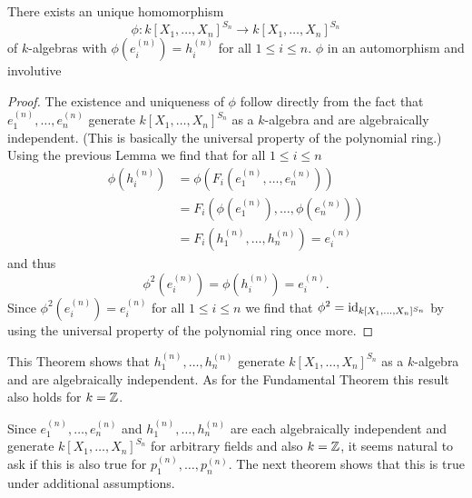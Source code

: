 \begin{thrm}
There exists an unique homomorphism
\[
 \phi : k[X_1, \ldots, X_n]^{S_n} \to k[X_1, \ldots, X_n]^{S_n}
\]
of $k$-algebras with $\phi\left(e^{(n)}_i\right) = h^{(n)}_i$ for all $1 \leq i \leq n$. $\phi$ in an automorphism and involutive
\end{thrm}
\begin{proof}
 The existence and uniqueness of $\phi$ follow directly from the fact that $e^{(n)}_1, \ldots, e^{(n)}_n$ generate $k[X_1, \ldots, X_n]^{S_n}$ as a $k$-algebra and are algebraically independent. (This is basically the universal property of the polynomial ring.) Using the previous Lemma we find that for all $1 \leq i \leq n$
 \begin{align*}
  \phi\left(h^{(n)}_i\right)
  &= \phi\left(F_i\left(e^{(n)}_1, \ldots, e^{(n)}_n\right)\right) \\
  &= F_i\left(\phi\left(e^{(n)}_1\right), \ldots, \phi\left(e^{(n)}_n\right)\right) \\
  &= F_i\left(h^{(n)}_1, \ldots, h^{(n)}_n\right)
  = e^{(n)}_i
 \end{align*}
 and thus
 \[
  \phi^2\left(e^{(n)}_i\right) = \phi\left(h^{(n)}_i\right) = e^{(n)}_i.
 \]
 Since $\phi^2\left(e^{(n)}_i\right) = e^{(n)}_i$ for all $1 \leq i \leq n$ we find that $\phi^2 = \operatorname{id}_{k[X_1, \ldots, X_n]^{S_n}}$ by using the universal property of the polynomial ring once more.
\end{proof}


This Theorem shows that $h^{(n)}_1, \ldots, h^{(n)}_n$ generate $k[X_1, \ldots, X_n]^{S_n}$ as a $k$-algebra and are algebraically independent. As for the Fundamental Theorem this result also holds for $k = \mathbb{Z}$.


Since $e^{(n)}_1, \ldots, e^{(n)}_n$ and $h^{(n)}_1, \ldots, h^{(n)}_n$ are each algebraically independent and generate $k[X_1, \ldots, X_n]^{S_n}$ for arbitrary fields and also $k = \mathbb{Z}$, it seems natural to ask if this is also true for $p^{(n)}_1, \ldots, p^{(n)}_n$. The next theorem shows that this is true under additional assumptions.


